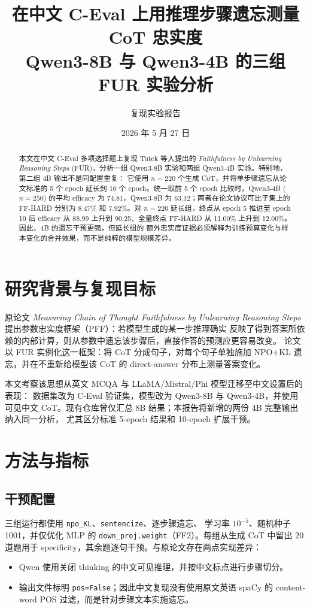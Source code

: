 \documentclass[UTF8,fontset=fandol,10pt,a4paper]{ctexart}
\title{\vspace{-1.1cm}\textbf{在中文 C-Eval 上用推理步骤遗忘测量 CoT 忠实度}\\
\large Qwen3-8B 与 Qwen3-4B 的三组 FUR 实验分析}
\author{复现实验报告}
\date{2026 年 5 月 27 日}
\begin{document}
\maketitle

\begin{abstract}
本文在中文 C-Eval 多项选择题上复现 Tutek 等人提出的
\textit{Faithfulness by Unlearning Reasoning Steps} (FUR)，分析一组
Qwen3-8B 实验和两组 Qwen3-4B 实验。特别地，第二组 4B 输出不是同配置重复：
它使用 \(n=220\) 个生成 CoT，并将单步骤遗忘从论文标准的 5 个 epoch 延长到
10 个 epoch。统一取前 5 个 epoch 比较时，Qwen3-4B (\(n=250\)) 的平均
efficacy 为 74.81，Qwen3-8B 为 63.12；两者在论文协议可比子集上的
FF-HARD 分别为 8.47\% 和 7.92\%。对 \(n=220\) 延长组，终点从 epoch 5
推进至 epoch 10 后 efficacy 从 88.99 上升到 90.25、全量终点
FF-HARD 从 11.00\% 上升到 12.00\%。因此，4B 的遗忘干预更强，但延长组的
额外忠实度证据必须解释为训练预算变化与样本变化的合并效果，而不是纯粹的模型规模差异。
\end{abstract}

\section{研究背景与复现目标}
原论文 \textit{Measuring Chain of Thought Faithfulness by Unlearning
Reasoning Steps} 提出参数忠实度框架（PFF）：若模型生成的某一步推理确实
反映了得到答案所依赖的内部计算，则从参数中遗忘该步骤后，直接作答的预测应更容易改变。
论文以 FUR 实例化这一框架：将 CoT 分成句子，对每个句子单独施加
NPO+KL 遗忘，并在不重新给模型该 CoT 的 direct-answer 分布上测量答案变化。

本文考察该思想从英文 MCQA 与 LLaMA/Mistral/Phi 模型迁移至中文设置后的表现：
数据集改为 C-Eval 验证集，模型改为 Qwen3-8B 与 Qwen3-4B，并使用可见中文
CoT。现有仓库曾仅汇总 8B 结果；本报告将新增的两份 4B 完整输出纳入同一分析，
尤其区分标准 5-epoch 结果和 10-epoch 扩展干预。

\section{方法与指标}
\subsection{干预配置}
三组运行都使用 \texttt{npo\_KL}、\texttt{sentencize}、逐步骤遗忘、
学习率 \(10^{-5}\)、随机种子 1001，并仅优化 MLP 的
\texttt{down\_proj.weight}（FF2）。每组从生成 CoT 中留出 20 道题用于
specificity，其余题逐句干预。与原论文存在两点实现差异：
\begin{itemize}
  \item Qwen 使用关闭 thinking 的中文可见推理，并按中文标点进行步骤切分。
  \item 输出文件标明 \texttt{pos=False}；因此中文复现没有使用原文英语
  spaCy 的 content-word POS 过滤，而是针对步骤文本实施遗忘。
\end{itemize}
\end{document}
